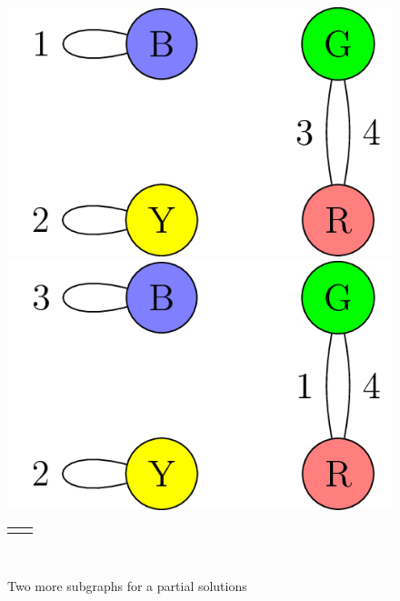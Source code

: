 \documentclass[10pt,]{book}
\theoremstyle{plain}
\theoremstyle{definition}
\theoremstyle{definition}
\theoremstyle{definition}
\theoremstyle{definition}
\numberwithin{equation}{section}
\newlength{\panelmax}
\begin{document}
\begin{figure}
\centering
{%
\setlength{\panelmax}{0pt}
\ifdefined\panelboxAimage\else\newsavebox{\panelboxAimage}\fi%
\begin{lrbox}{\panelboxAimage}
\includegraphics[width=0.4\linewidth]{images/InstantInsanityImpossibleSecond.png}
\end{lrbox}
\ifdefined\phAimage\else\newlength{\phAimage}\fi%
\setlength{\phAimage}{\ht\panelboxAimage+\dp\panelboxAimage}
\settototalheight{\phAimage}{\usebox{\panelboxAimage}}
\setlength{\panelmax}{\maxof{\panelmax}{\phAimage}}
\ifdefined\panelboxBimage\else\newsavebox{\panelboxBimage}\fi%
\begin{lrbox}{\panelboxBimage}
\includegraphics[width=0.4\linewidth]{images/InstantInsanityImpossibleThird.png}
\end{lrbox}
\ifdefined\phBimage\else\newlength{\phBimage}\fi%
\setlength{\phBimage}{\ht\panelboxBimage+\dp\panelboxBimage}
\settototalheight{\phBimage}{\usebox{\panelboxBimage}}
\setlength{\panelmax}{\maxof{\panelmax}{\phBimage}}
\leavevmode%
\setlength{\tabcolsep}{0.05\linewidth}
\par\medskip\noindent
\hspace*{0.05\linewidth}%
\begin{tabular}{@{}*{2}{c}@{}}
\begin{minipage}[c][\panelmax][c]{0.4\linewidth}\usebox{\panelboxAimage}\end{minipage}&
\begin{minipage}[c][\panelmax][c]{0.4\linewidth}\usebox{\panelboxBimage}\end{minipage}\end{tabular}\\
}%
\caption{Two more subgraphs for a partial solutions\label{fig_impossible_twoandthree}}
\end{figure}
\end{document}

